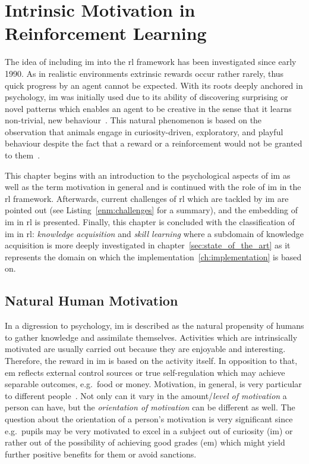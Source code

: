 \documentclass[draft,final]{vutinfth} %
\begin{document}
    \chapter{Intrinsic Motivation in Reinforcement Learning}\label{ch:intrinsic-motivation-in-reinforcement-learning}
    The idea of including \gls{im} into the \gls{rl} framework has been investigated since early 1990.
    As in realistic environments extrinsic rewards occur rather rarely, thus quick progress by an agent cannot be expected.
    With its roots deeply anchored in psychology, \gls{im} was initially used due to its ability of discovering surprising or novel patterns which enables an agent to be creative in the sense that it learns non-trivial, new behaviour~\citep{schmidhuber_formal_2010}.
    This natural phenomenon is based on the observation that animals engage in curiosity-driven, exploratory, and playful behaviour despite the fact that a reward or a reinforcement would not be granted to them~\citep{white_motivation_1959}.

    This chapter begins with an introduction to the psychological aspects of \gls{im} as well as the term motivation in general and is continued with the role of \gls{im} in the \gls{rl} framework.
    Afterwards, current challenges of \gls{rl} which are tackled by \gls{im} are pointed out (see Listing~\ref{enm:challenges} for a summary), and the embedding of \gls{im} in \gls{rl} is presented.
    Finally, this chapter is concluded with the classification of \gls{im} in \gls{rl}: \textit{knowledge acquisition} and \textit{skill learning} where a subdomain of knowledge acquisition is more deeply investigated in chapter~\ref{sec:state_of_the_art} as it represents the domain on which the implementation~\eqref{ch:implementation} is based on.


    \section{Natural Human Motivation}

    In a digression to psychology, \gls{im} is described as the natural propensity of humans to gather knowledge and assimilate themselves.
    Activities which are intrinsically motivated are usually carried out because they are enjoyable and interesting.
    Therefore, the reward in \gls{im} is based on the activity itself.
    In opposition to that, \gls{em} reflects external control sources or true self-regulation which may achieve separable outcomes, e.g.\ food or money.
    Motivation, in general, is very particular to different people~\citep{ryan_intrinsic_2000}.
    Not only can it vary in the amount/\textit{level of motivation} a person can have, but the \textit{orientation of motivation} can be different as well.
    The question about the orientation of a person's motivation is very significant since e.g.\ pupils may be very motivated to excel in a subject out of curiosity (\gls{im}) or rather out of the possibility of achieving good grades (\gls{em}) which might yield further positive benefits for them or avoid sanctions.
\end{document}
